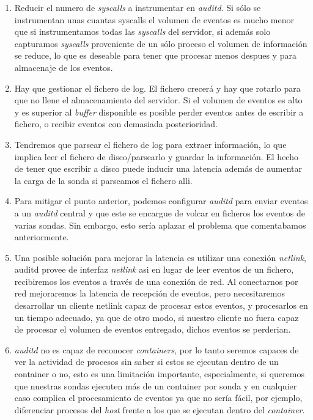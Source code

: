 \begin{enumerate}
    \item Reducir el numero de \emph{syscalls} a instrumentar en \emph{auditd}. Si sólo se instrumentan unas cuantas syscalls el volumen de eventos es mucho menor que si
    instrumentamos todas las \emph{syscalls} del servidor, si además solo capturamos \emph{syscalls} proveniente de un sólo proceso el volumen de información se reduce, lo que es 
    deseable para tener que procesar menos despues y para almacenaje de los eventos.
    \item Hay que gestionar el fichero de log. El fichero crecerá y hay que rotarlo para que no llene el almacenamiento del servidor. Si el volumen de eventos es alto y es superior 
    al \emph{buffer} disponible es posible perder eventos antes de escribir a fichero, o recibir eventos con demasiada posterioridad.
    \item Tendremos que parsear el fichero de log para extraer información, lo que implica leer el fichero de disco/parsearlo y guardar la información. El hecho de tener que escribir a disco puede inducir una latencia además de aumentar la carga de la sonda si parseamos el fichero alli.
    \item Para mitigar el punto anterior, podemos configurar \emph{auditd} para enviar eventos a un \emph{auditd} central y que este se encargue de volcar en ficheros los eventos de varias sondas. Sin embargo, esto sería aplazar el problema
    que comentabamos anteriormente.
    \item Una posible solución para mejorar la latencia es utilizar una conexión \emph{netlink},
    auditd provee de interfaz \emph{netlink} asi en lugar de leer eventos de un fichero, 
    recibiremos los eventos a través de una conexión de red. 
    Al conectarnos por red mejoraremos la latencia de recepción de eventos, 
    pero necesitaremos desarrollar un cliente netlink capaz de procesar estos eventos, 
    y procesarlos en un tiempo adecuado, ya que de otro modo, 
    si nuestro cliente no fuera capaz de procesar el volumen de eventos entregado,
    dichos eventos se perderian.
    \item \emph{auditd} no es capaz de reconocer \emph{containers}, por lo tanto seremos capaces de ver la actividad de procesos
    sin saber si estos se ejecutan dentro de un container o no, esto es una limitación importante, especialmente, si queremos que nuestras sondas
    ejecuten más de un container por sonda y en cualquier caso complica el procesamiento de eventos ya que no sería fácil, por ejemplo, diferenciar procesos
    del \emph{host} frente a los que se ejecutan dentro del \emph{container}.
\end{enumerate}

